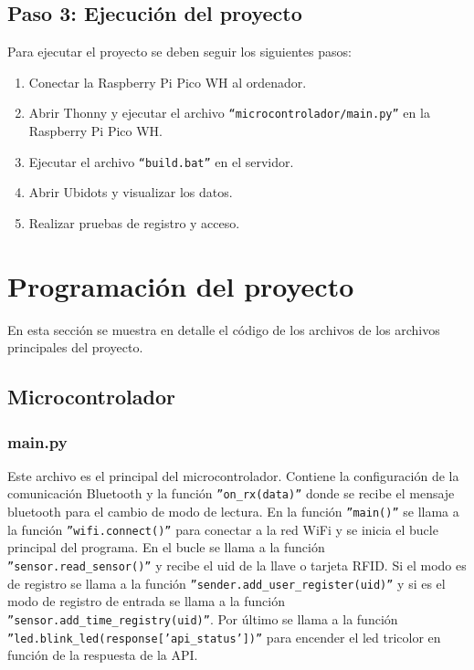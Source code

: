 \documentclass{article}
\begin{document}
\subsection{Paso 3: Ejecución del proyecto}
Para ejecutar el proyecto se deben seguir los siguientes pasos:
\begin{enumerate}
	\item Conectar la Raspberry Pi Pico WH al ordenador.
	\item Abrir Thonny y ejecutar el archivo \texttt{``microcontrolador/main.py''} en la Raspberry Pi Pico WH.
	\item Ejecutar el archivo \texttt{``build.bat''} en el servidor.
	\item Abrir Ubidots y visualizar los datos.
	\item Realizar pruebas de registro y acceso.
\end{enumerate}

\section{Programación del proyecto}
En esta sección se muestra en detalle el código de los archivos de los archivos principales del proyecto.

\subsection{Microcontrolador}
\subsubsection{main.py}
Este archivo es el principal del microcontrolador.
Contiene la configuración de la comunicación Bluetooth y la función \texttt{''on\_rx(data)''} donde se recibe el mensaje bluetooth para el cambio de modo de lectura.
En la función \texttt{''main()''} se llama a la función \texttt{''wifi.connect()''} para conectar a la red WiFi y se inicia el bucle principal del programa.
En el bucle se llama a la función \texttt{''sensor.read\_sensor()''} y recibe el uid de la llave o tarjeta RFID. 
Si el modo es de registro se llama a la función \texttt{''sender.add\_user\_register(uid)''} y si es el modo de registro de entrada se llama a la función \texttt{''sensor.add\_time\_registry(uid)''}.
Por último se llama a la función \texttt{''led.blink\_led(response['api\_status'])''} para encender el led tricolor en función de la respuesta de la API.
\end{document}
